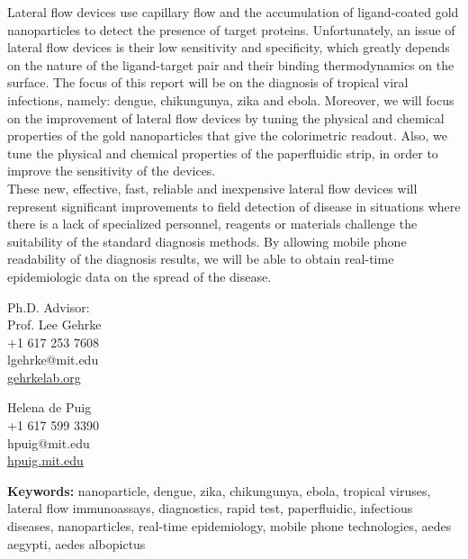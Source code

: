 \documentclass{article}
\begin{document}
Lateral flow devices use capillary flow and the accumulation of ligand-coated gold nanoparticles to detect the presence of target proteins. Unfortunately, an issue of lateral flow devices is their low sensitivity and specificity, which greatly depends on the nature of the ligand-target pair and their binding thermodynamics on the surface. The focus of this report will be on the diagnosis of tropical viral infections, namely: dengue, chikungunya, zika and ebola. Moreover, we will focus on the improvement of lateral flow devices by tuning the physical and chemical properties of the gold nanoparticles that give the colorimetric readout. Also, we tune the physical and chemical properties of the paperfluidic strip, in order to improve the sensitivity of the devices. \\
These new, effective, fast, reliable and inexpensive lateral flow devices will represent significant improvements to field detection of disease in situations where there is a lack of specialized personnel, reagents or materials challenge the suitability of the standard diagnosis methods. By allowing mobile phone readability of the diagnosis results, we will be able to obtain real-time epidemiologic data on the spread of the disease.\\
\vspace*{1cm}


\begin{minipage}[t]{5cm}
\flushleft
\noindent
Ph.D. Advisor:\\
Prof. Lee Gehrke\\
+1 617 253 7608\\
lgehrke@mit.edu\\
\href{http://www.gehrkelab.org}{gehrkelab.org}
\end{minipage}
\hfill
\begin{minipage}[t]{5cm}
\flushright
\null
Helena de Puig \\+1 617 599 3390\\hpuig@mit.edu\\\href{http://www.hpuig.mit.edu}{hpuig.mit.edu}
\end{minipage}
\vfill
\noindent
\textbf{Keywords:} nanoparticle, dengue, zika, chikungunya, ebola, tropical viruses, lateral flow immunoassays, diagnostics, rapid test, paperfluidic, infectious diseases, nanoparticles, real-time epidemiology, mobile phone technologies, aedes aegypti, aedes albopictus
\restoregeometry
\newpage
\end{document}
